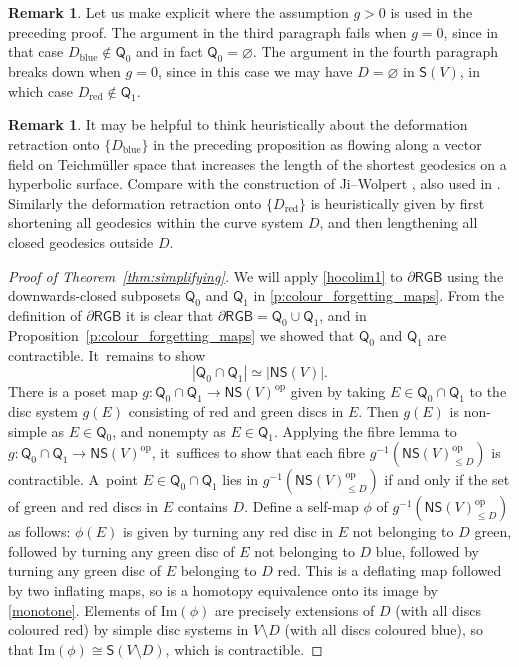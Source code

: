 \documentclass[JEP,XML,SOM,Unicode,NoFloatCountersInSection,published]{cedram}
\theoremstyle{plain}
\theoremstyle{definition}
\newtheorem{rem}[thm]{Remark}
\newcommand{\dRGB}{\partial\mathsf{RGB}}
\newcommand{\NS}{\mathsf{NS}}
\newcommand{\SD}{\mathsf{S}}
\begin{document}
\begin{rem}
Let us make explicit where the assumption $g>0$ is used in the preceding proof. The argument in the third paragraph fails when $g=0$, since in that case $D_{\mathrm{blue}} \notin \mathsf Q_0$ and in fact $\mathsf Q_0 = \varnothing$. The argument in the fourth paragraph breaks down when $g=0$, since in this case we may have $D=\varnothing$ in $\SD(V)$, in which case $D_{\mathrm{red}} \notin \mathsf Q_1$.
\end{rem}

\begin{rem}
It may be helpful to think heuristically about the deformation retraction onto $\{D_{\mathrm{blue}}\}$ in the preceding proposition as flowing along a vector field on Teichmüller space that increases the length of the shortest geodesics on a hyperbolic surface. Compare with the construction of Ji--Wolpert \cite[\S 3]{jiwolpert}, also used in \cite{hainautpetersen}. Similarly the deformation retraction onto $\{D_{\mathrm{red}}\}$ is heuristically given by first shortening all geodesics within the curve system $D$, and then lengthening all closed geodesics outside $D$.
\end{rem}

\begin{proof}[Proof of Theorem~\ref{thm:simplifying}]
We will apply \cref{hocolim1} to $\dRGB$ using the downwards-closed subposets $\mathsf Q_0$ and $\mathsf Q_1$ in \cref{p:colour_forgetting_maps}. From the definition of $\dRGB$ it is clear that $\dRGB =\mathsf Q_0 \cup \mathsf Q_1$, and in Proposition~\ref{p:colour_forgetting_maps} we showed that $\mathsf Q_0$ and $\mathsf Q_1$ are contractible. It~remains to show
\[
|\mathsf Q_0 \cap \mathsf Q_1|\simeq |\NS(V)|.
\]
There is a poset map $g:\mathsf Q_0 \cap \mathsf Q_1\to \NS(V)^{\text{op}}$ given by taking $E \in \mathsf Q_0 \cap \mathsf Q_1$ to the disc system $g(E)$ consisting of red and green discs in $E$. Then $g(E)$ is non-simple as $E \in \mathsf Q_0$, and nonempty as $E \in \mathsf Q_1$. Applying the fibre lemma to $g:\mathsf Q_0 \cap \mathsf Q_1\to \NS(V)^{\text{op}}$, it~suffices to show that each fibre $g^{-1}(\NS(V)^\text{op}_{\leq D})$ is contractible. A~point $E \in \mathsf Q_0 \cap \mathsf Q_1$ lies in $g^{-1}(\NS(V)^\text{op}_{\leq D})$ if and only if the set of green and red discs in $E$ contains $D$. Define a self-map $\phi$ of $g^{-1}(\NS(V)^\text{op}_{\leq D})$ as follows: $\phi(E)$ is given by turning any red disc in $E$ not belonging to $D$ green, followed by turning any green disc of $E$ not belonging to $D$ blue, followed by turning any green disc of $E$ belonging to $D$ red. This is a deflating map followed by two inflating maps, so is a homotopy equivalence onto its image by \cref{monotone}. Elements of $\mathrm{Im}(\phi)$ are precisely extensions of $D$ (with all discs coloured red) by simple disc systems in $V \setminus D$ (with all discs coloured blue), so that $\mathrm{Im}(\phi) \cong \SD(V\setminus D)$, which is contractible.
\end{proof}
\end{document}
